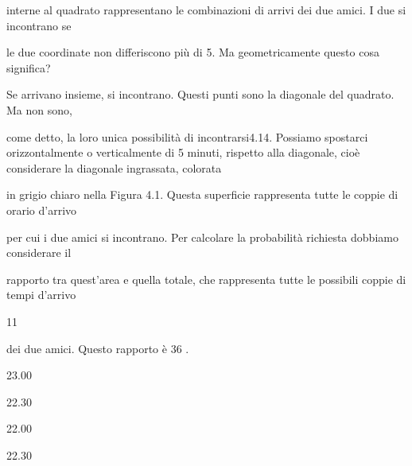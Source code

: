 \documentclass[a4paper,portrait,12pt]{article}
\begin{document}
\begin{flushleft}
interne al quadrato rappresentano le combinazioni di arrivi dei due amici. I due si incontrano se
\end{flushleft}


\begin{flushleft}
le due coordinate non differiscono più di 5. Ma geometricamente questo cosa significa?
\end{flushleft}


\begin{flushleft}
Se arrivano insieme, si incontrano. Questi punti sono la diagonale del quadrato. Ma non sono,
\end{flushleft}


\begin{flushleft}
come detto, la loro unica possibilit\`{a} di incontrarsi4.14. Possiamo spostarci orizzontalmente o verticalmente di 5 minuti, rispetto alla diagonale, cio\`{e} considerare la diagonale ingrassata, colorata
\end{flushleft}


\begin{flushleft}
in grigio chiaro nella Figura 4.1. Questa superficie rappresenta tutte le coppie di orario d'arrivo
\end{flushleft}


\begin{flushleft}
per cui i due amici si incontrano. Per calcolare la probabilit\`{a} richiesta dobbiamo considerare il
\end{flushleft}


\begin{flushleft}
rapporto tra quest'area e quella totale, che rappresenta tutte le possibili coppie di tempi d'arrivo
\end{flushleft}


11


\begin{flushleft}
dei due amici. Questo rapporto \`{e} 36 .
\end{flushleft}


23.00





22.30





22.00





22.30
\end{document}
